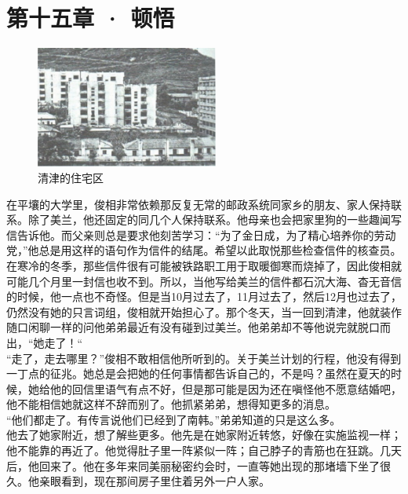 \fancyhead[RO]{\thepage}
\fancyhead[LE]{\thepage}
\fancyfoot[LE,RO]{}
\fancyfoot[LO,CE]{}
\fancyfoot[CO,RE]{}
\chapter*{第十五章 · 顿悟}
\begin{figure}[!htbp]
\centering
\includegraphics[width=6cm]{./Chapters/Images/15.jpg}
\caption*{清津的住宅区}
\end{figure}


在平壤的大学里，俊相非常依赖那反复无常的邮政系统同家乡的朋友、家人保持联系。除了美兰，他还固定的同几个人保持联系。他母亲也会把家里狗的一些趣闻写信告诉他。而父亲则总是要求他刻苦学习：“为了金日成，为了精心培养你的劳动党，”他总是用这样的语句作为信件的结尾。希望以此取悦那些检查信件的核查员。在寒冷的冬季，那些信件很有可能被铁路职工用于取暖御寒而烧掉了，因此俊相就可能几个月里一封信也收不到。所以，当他写给美兰的信件都石沉大海、杳无音信的时候，他一点也不奇怪。但是当10月过去了，11月过去了，然后12月也过去了，仍然没有她的只言词组，俊相就开始担心了。那个冬天，当一回到清津，他就装作随口闲聊一样的问他弟弟最近有没有碰到过美兰。他弟弟却不等他说完就脱口而出，“她走了！“\\

“走了，走去哪里？”俊相不敢相信他所听到的。关于美兰计划的行程，他没有得到一丁点的征兆。她总是会把她的任何事情都告诉自己的，不是吗？虽然在夏天的时候，她给他的回信里语气有点不好，但是那可能是因为还在嗔怪他不愿意结婚吧，他不能相信她就这样不辞而别了。他抓紧弟弟，想得知更多的消息。\\

“他们都走了。有传言说他们已经到了南韩。”弟弟知道的只是这么多。\\

他去了她家附近，想了解些更多。他先是在她家附近转悠，好像在实施监视一样；他不能靠的再近了。他觉得肚子里一阵紧似一阵；自己脖子的青筋也在狂跳。几天后，他回来了。他在多年来同美丽秘密约会时，一直等她出现的那堵墙下坐了很久。他亲眼看到，现在那间房子里住着另外一户人家。\\

